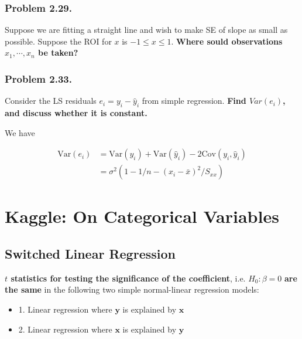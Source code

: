 \documentclass[12pt]{article}
\begin{document}
\subsubsection*{Problem 2.29.} Suppose we are fitting a straight line and wish to make SE of slope as small as possible. Suppose the ROI for $x$ is $-1 \le x \le 1$. \textbf{Where sould observations $x_1, \cdots, x_n$ be taken?}

\bigskip

\subsubsection*{Problem 2.33.} Consider the LS residuals $e_i = y_i - \hat{y}_i$ from simple regression. \textbf{Find $Var(e_i)$, and discuss whether it is constant.}

\bigskip

We have

$$
\begin{aligned}
\mathrm{Var}(e_i) &= \mathrm{Var}(y_i) + \mathrm{Var}(\hat{y}_i) - 2 \mathrm{Cov}(y_i, \hat{y}_i) \\[8pt]
&= \sigma^2 (1 - 1/n - (x_i - \bar{x})^2/S_{xx})
\end{aligned}
$$

\pagebreak

\section*{Kaggle: On Categorical Variables}

\setcounter{section}{1}
\setcounter{subsection}{0}


\subsection{Switched Linear Regression}

\textbf{$t$ statistics for testing the significance of the coefficient}, i.e. $H_0 : \beta = 0$ \textbf{are the same} in the following two simple normal-linear regression models: 

\begin{itemize}
	\item 1. Linear regression where $\mathbf{y}$ is explained by $\mathbf{x}$
	\item 2. Linear regression where $\mathbf{x}$ is explained by $\mathbf{y}$
\end{itemize}
\end{document}
